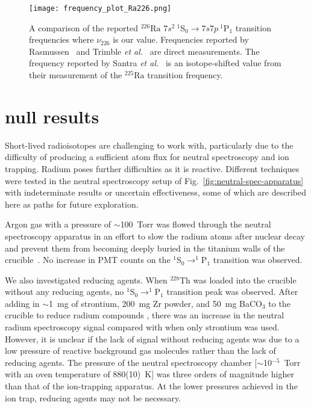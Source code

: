 \documentclass[
 reprint,
 amsmath,amssymb,
 aps,
 prr,
 superscriptaddress,
]{revtex4-2}
\newcommand{\iso}[2]{\ensuremath{^{#2}\mathrm{#1}}}
\begin{document}
\begin{figure}
    \centering
    \texttt{[image: frequency\_plot\_Ra226.png]}
    \caption{A comparison of the reported \iso{Ra}{226} \mbox{$7s^2\ ^1$S$_0 \rightarrow 7s7p\ ^1$P$_1$} transition frequencies where $\nu_{226}$ is our value. Frequencies reported by Rasmussen~\cite{Rasmussen1933} and Trimble \emph{et al.}~\cite{Trimble2009} are direct measurements. The frequency reported by Santra \emph{et al.}~\cite{Santra2014} is an isotope-shifted value from their measurement of the \iso{Ra}{225} transition frequency.}
    \label{fig:Ra226-freqs}
\end{figure}



\section{null results}\label{sec:null-tests}

Short-lived radioisotopes are challenging to work with, particularly due to the difficulty of producing a sufficient atom flux for neutral spectroscopy and ion trapping. Radium poses further difficulties as it is reactive. Different techniques were tested in the neutral spectroscopy setup of Fig.~\ref{fig:neutral-spec-apparatus} with indeterminate results or uncertain effectiveness, some of which are described here as paths for future exploration. 

Argon gas with a pressure of $\sim$100~Torr was flowed through the neutral spectroscopy apparatus in an effort to slow the radium atoms after nuclear decay and prevent them from becoming deeply buried in the titanium walls of the crucible~\cite{Wense2016}. No increase in PMT counts on the \mbox{$^1$S$_0 \rightarrow ^1$P$_1$} transition was observed.

We also investigated reducing agents. When \iso{Th}{228} was loaded into the crucible without any reducing agents, no \mbox{$^1$S$_0 \rightarrow ^1$P$_1$} transition peak was observed. After adding in $\sim$1~mg of strontium, 200~mg Zr powder, and 50~mg BaCO$_3$ to the crucible to reduce radium compounds \cite{Santra2014}, there was an increase in the neutral radium spectroscopy signal compared with when only strontium was used. However, it is unclear if the lack of signal without reducing agents was due to a low pressure of reactive background gas molecules rather than the lack of reducing agents. The pressure of the neutral spectroscopy chamber [$\sim$10$^{-5}$~Torr with an oven temperature of 880(10)~K] was three orders of magnitude higher than that of the ion-trapping apparatus. At the lower pressures achieved in the ion trap, reducing agents may not be necessary.
\end{document}
